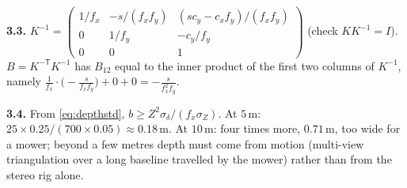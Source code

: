 \textbf{3.3.} $K^{-1}=\begin{pmatrix}1/f_x&-s/(f_xf_y)&(sc_y-c_xf_y)/
(f_xf_y)\\0&1/f_y&-c_y/f_y\\0&0&1\end{pmatrix}$ (check $KK^{-1}=I$).
$B=K^{-\mathsf T}K^{-1}$ has $B_{12}$ equal to the inner product of the
first two columns of $K^{-1}$, namely $\frac1{f_x}\cdot\bigl(-\frac{s}
{f_xf_y}\bigr)+0+0=-\frac{s}{f_x^2f_y}$.

\textbf{3.4.} From \eqref{eq:depthstd}, $b\ge Z^2\sigma_\delta/(f_x
\sigma_Z)$. At $5$\,m: $25\times0.25/(700\times0.05)\approx0.18$\,m. At
$10$\,m: four times more, $0.71$\,m, too wide for a mower; beyond a few
metres depth must come from motion (multi-view triangulation over a
long baseline travelled by the mower) rather than from the stereo rig
alone.
